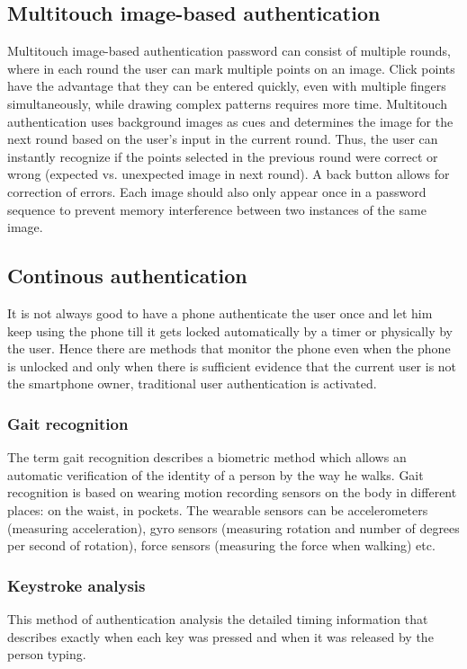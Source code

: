 \subsection{Multitouch image-based authentication}
Multitouch image-based authentication password can consist of multiple rounds, where in each round the user can mark multiple points on an image. Click points have the advantage that they can be entered quickly,  even with multiple fingers simultaneously, while drawing complex patterns requires more time. Multitouch authentication uses background images as cues and determines the image for the next round based on the user’s input in the current round. Thus, the user can instantly recognize if the points selected in the previous round were correct or wrong (expected vs. unexpected image in next round). A back button allows for correction of errors. Each image should also only appear once in a password sequence to prevent memory interference between two instances of the same image. \cite{ritter2013miba}

\subsection{Continous authentication}
It is not always good to have a phone authenticate the user once and let him keep using the phone till it gets locked automatically by a timer or physically by the user. Hence there are methods that monitor the phone even when the phone is unlocked and only when there is sufficient evidence that the current user is not the smartphone owner, traditional user authentication is activated. 

\subsubsection{Gait recognition}
The term gait recognition describes a biometric method
which allows an automatic verification of the identity of a person by the way he walks. Gait recognition is based on wearing motion recording sensors on the body in different places: on the waist, in pockets. The wearable sensors can be accelerometers (measuring acceleration), gyro sensors (measuring rotation and number of degrees per second of rotation), force sensors (measuring the force when walking) etc. \cite{derawi2010unobtrusive}

\subsubsection{Keystroke analysis}
This method of authentication analysis the detailed timing information that describes exactly when each key was pressed and when it was released by the person typing. \cite{buchoux2008deployment}


